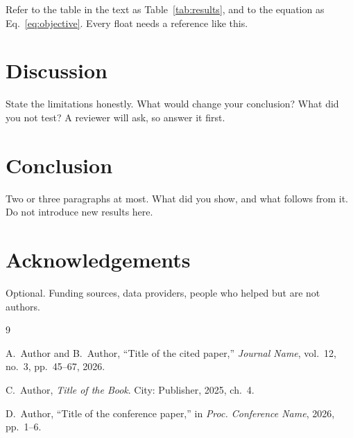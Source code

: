 \documentclass[11pt,a4paper]{article}
\begin{document}
Refer to the table in the text as Table~\ref{tab:results}, and to the equation
as Eq.~\eqref{eq:objective}. Every float needs a reference like this.

\section{Discussion}

State the limitations honestly. What would change your conclusion? What did you
not test? A reviewer will ask, so answer it first.

\section{Conclusion}

Two or three paragraphs at most. What did you show, and what follows from it.
Do not introduce new results here.

\section*{Acknowledgements}
Optional. Funding sources, data providers, people who helped but are not authors.

\begin{thebibliography}{9}

A.~Author and B.~Author, ``Title of the cited paper,''
\emph{Journal Name}, vol.~12, no.~3, pp.~45--67, 2026.

C.~Author, \emph{Title of the Book}. City: Publisher, 2025, ch.~4.

D.~Author, ``Title of the conference paper,'' in \emph{Proc. Conference Name},
2026, pp.~1--6.

\end{thebibliography}
\end{document}
